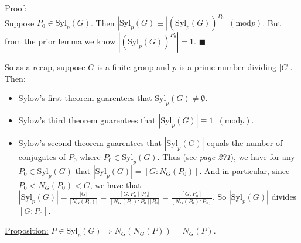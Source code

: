 \documentclass{book}
\newcommand{\inLinkRap}[2]{{\color{blue}\hyperlink{#1}{\textit{#2}}}}
\newcommand{\myComment}{%
   \color{RawerSienna}%
   \fontsize{12}{14}\selectfont%
}
\newcommand{\exThreeP}{%
   \color{RedViolet}%
   \fontsize{12}{14}\selectfont%
}
\newenvironment{myIndent}{%
   \begin{adjustwidth}{2.5em}{0em}%
}{%
   \end{adjustwidth}%
}
\newcommand{\mMod}[1]{\phantom{a}(\mathrel{\mathrm{mod}} #1)}
\newcommand{\Syl}{\mathrm{Syl}}
\newcommand{\retTwo}{\hfill\bigbreak}
\begin{document}
\begin{myIndent}\exThreeP
	Proof:\\
	Suppose $P_0 \in \Syl_p(G)$. Then $|\Syl_p(G) \equiv |(\Syl_p(G))^{P_0} \mMod{p}$. But from the prior lemma we know $|(\Syl_p(G))^{P_0}| = 1$. $\blacksquare$\retTwo

	\myComment So as a recap, suppose $G$ is a finite group and $p$ is a prime number dividing $|G|$. Then:
	\begin{itemize}
		\item Sylow's first theorem guarentees that $\Syl_p(G) \neq \emptyset$.
		\item Sylow's third theorem guarentees that $|\Syl_p(G)| \equiv 1 \mMod{p}$.
		\item Sylow's second theorem guarentees that $|\Syl_p(G)|$ equals the number of conjugates of $P_0$ where $P_0 \in \Syl_p(G)$. Thus (see  \inLinkRap{page 271 reference}{page 271}), we have for any $P_0 \in \Syl_p(G)$ that $|\Syl_p(G)| = [G : N_G(P_0)]$. And in particular, since $P_0 < N_G(P_0) < G$, we have that $|\Syl_p(G)| = \frac{|G|}{|N_G(P_0)|} = \frac{[G : P_0]|P_0|}{[N_G(P_0) : P_0]|P_0|} = \frac{[G : P_0]}{[N_G(P_0) : P_0]}$. So $|\Syl_p(G)|$ divides $[G : P_0]$.\retTwo
	\end{itemize}
\end{myIndent}

\ul{Proposition:} $P \in \Syl_p(G) \Longrightarrow N_G(N_G(P)) = N_G(P)$.
\end{document}
